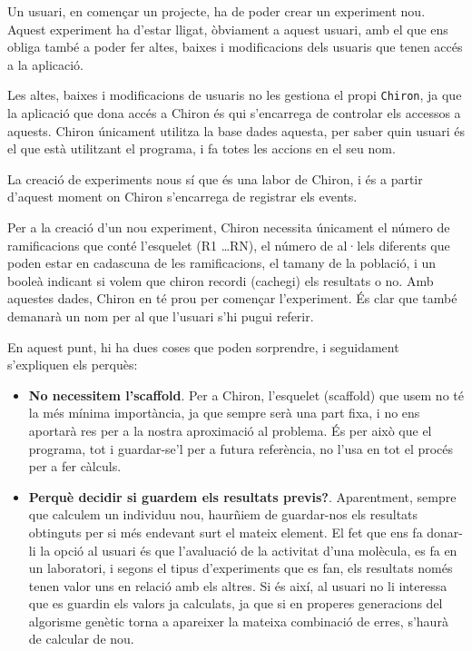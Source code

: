 Un usuari, en començar un projecte, ha de poder crear un experiment nou.  Aquest
experiment ha d'estar lligat, òbviament a aquest usuari, amb el que ens obliga
també a poder fer altes, baixes i modificacions dels usuaris que tenen accés a
la aplicació.

Les altes, baixes i modificacions de usuaris no les gestiona el propi
\texttt{Chiron}, ja que la aplicació que dona accés a Chiron és qui s'encarrega
de controlar els accessos a aquests.  Chiron únicament utilitza la base dades
aquesta, per saber quin usuari és el que està utilitzant el programa, i fa totes
les accions en el seu nom.

La creació de experiments nous sí que és una labor de Chiron, i és a partir
d'aquest moment on Chiron s'encarrega de registrar els events.

Per a la creació d'un nou experiment, Chiron necessita únicament el número de
ramificacions que conté l'esquelet (R1 \dots RN), el número de al·lels diferents que
poden estar en cadascuna de les ramificacions, el tamany de la població, i un booleà
indicant si volem que chiron recordi (cachegi) els resultats o no.  Amb aquestes
dades, Chiron en té prou per començar l'experiment.  És clar que també demanarà
un nom per al que l'usuari s'hi pugui referir.

En aquest punt, hi ha dues coses que poden sorprendre, i seguidament s'expliquen
els perquès:

\begin{itemize}
	\item \textbf{No necessitem l'scaffold}. Per a Chiron, l'esquelet (scaffold)
	que usem no té la més mínima importància, ja que sempre serà una part fixa,
	i no ens aportarà res per a la nostra aproximació al problema.  És per això
	que el programa, tot i guardar-se'l per a futura referència, no l'usa en tot
	el procés per a fer càlculs.

	\item \textbf{Perquè decidir si guardem els resultats previs?}.
	Aparentment, sempre que calculem un individuu nou, haurñiem de guardar-nos
	els resultats obtinguts per si més endevant surt el mateix element.  El fet
	que ens fa donar-li la opció al usuari és que l'avaluació de la activitat
	d'una molècula, es fa en un laboratori, i segons el tipus d'experiments que
	es fan, els resultats només tenen valor uns en relació amb els altres.  Si
	és així, al usuari no li interessa que es guardin els valors ja calculats,
	ja que si en properes generacions del algorisme genètic torna a apareixer la
	mateixa combinació de erres, s'haurà de calcular de nou.
\end{itemize}

